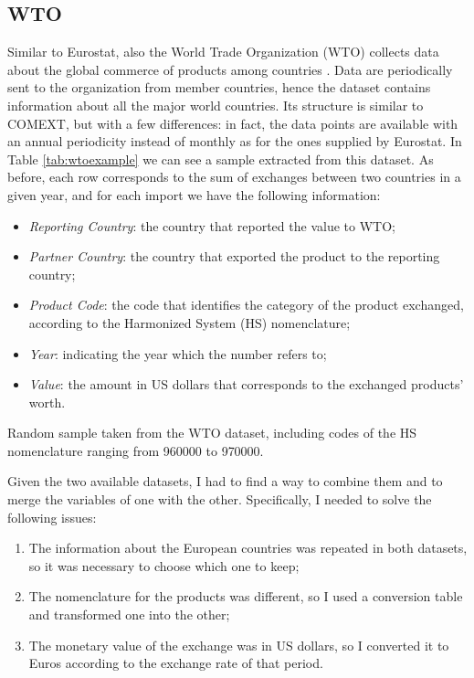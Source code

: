 \subsection{WTO}
Similar to Eurostat, also the World Trade Organization (WTO) collects data about the global commerce of products among countries \cite{wto2022stats}. Data are periodically sent to the organization from member countries, hence the dataset contains information about all the major world countries.
Its structure is similar to COMEXT, but with a few differences: in fact, the data points are available with an annual periodicity instead of monthly as for the ones supplied by Eurostat. In Table \ref{tab:wtoexample} we can see a sample extracted from this dataset. As before, each row corresponds to the sum of exchanges between two countries in a given year, and for each import we have the following information:
\begin{itemize}
    \item \textit{Reporting Country}: the country that reported the value to WTO;
    \item \textit{Partner Country}: the country that exported the product to the reporting country;
    \item \textit{Product Code}: the code that identifies the category of the product exchanged, according to the Harmonized System (HS) nomenclature;
    \item \textit{Year}: indicating the year which the number refers to;
    \item \textit{Value}: the amount in US dollars that corresponds to the exchanged products' worth.
\end{itemize}

\begin{table}
    \centering
    
    \caption[Random sample taken from the WTO dataset]{Random sample taken from the WTO dataset, including codes of the HS nomenclature ranging from 960000 to 970000.}
    \label{tab:wtoexample}
\end{table}

Given the two available datasets, I had to find a way to combine them and to merge the variables of one with the other. Specifically, I needed to solve the following issues:
\begin{enumerate}
    \item The information about the European countries was repeated in both datasets, so it was necessary to choose which one to keep;
    \item The nomenclature for the products was different, so I used a conversion table and transformed one into the other;
    \item The monetary value of the exchange was in US dollars, so I converted it to Euros according to the exchange rate of that period.
\end{enumerate}

